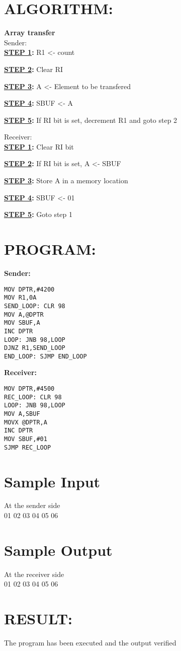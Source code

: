 \vspace{30pt}

\section*{ALGORITHM:}
\textbf{Array transfer}\\
\large{Sender:}\\

\textbf{\underline{STEP 1}:} R1 <- count

\textbf{\underline{STEP 2}:} Clear RI

\textbf{\underline{STEP 3}:} A <- Element to be transfered

\textbf{\underline{STEP 4}:} SBUF <- A

\textbf{\underline{STEP 5}:} If RI bit is set, decrement R1 and goto step 2

\large{Receiver:}\\

\textbf{\underline{STEP 1}:} Clear RI bit

\textbf{\underline{STEP 2}:} If RI bit is set, A <- SBUF

\textbf{\underline{STEP 3}:} Store A in a memory location

\textbf{\underline{STEP 4}:} SBUF <- 01

\textbf{\underline{STEP 5}:} Goto step 1


\section*{PROGRAM:}
\textbf{Sender:}
\begin{lstlisting}
MOV DPTR,#4200
MOV R1,0A
SEND_LOOP: CLR 98 
MOV A,@DPTR
MOV SBUF,A
INC DPTR
LOOP: JNB 98,LOOP
DJNZ R1,SEND_LOOP
END_LOOP: SJMP END_LOOP
\end{lstlisting}

\vspace{20pt}

\textbf{Receiver:}
\begin{lstlisting}
MOV DPTR,#4500
REC_LOOP: CLR 98
LOOP: JNB 98,LOOP
MOV A,SBUF
MOVX @DPTR,A
INC DPTR
MOV SBUF,#01
SJMP REC_LOOP
\end{lstlisting}


\section*{Sample Input}
At the sender side\\
01 02 03 04 05 06

\section*{Sample Output}
At the receiver side\\
01 02 03 04 05 06

\section*{RESULT:}
The program has been executed and the output verified
%
%
%
%
